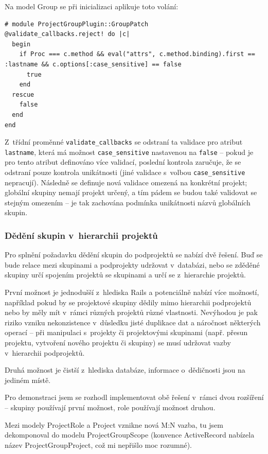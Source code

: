 \documentclass[thesis=B,czech]{FITthesis}[2012/05/02]
\begin{document}
Na model Group se při inicializaci aplikuje toto volání:

\begin{lstlisting}
# module ProjectGroupPlugin::GroupPatch
@validate_callbacks.reject! do |c|
  begin
    if Proc === c.method && eval("attrs", c.method.binding).first == :lastname && c.options[:case_sensitive] == false
      true
    end
  rescue
    false
  end
end
\end{lstlisting}
Z~třídní proměnné \lstinline!validate_callbacks! se odstraní ta validace
pro atribut \lstinline!lastname!, která má možnost
\lstinline!case_sensitive! nastavenou na \lstinline!false! -- pokud je pro
tento atribut definováno více validací, poslední kontrola zaručuje, že
se odstraní pouze kontrola unikátnosti (jiné validace s~volbou
\lstinline!case_sensitive! nepracují). Následně se definuje nová
validace omezená na konkrétní projekt; globální skupiny nemají projekt
určený, a tím pádem se budou také validovat se stejným omezením -- je tak
zachována podmínka unikátnosti názvů globálních skupin.

\subsubsection{Dědění skupin v~hierarchii projektů}
\label{sec:proj_group_inherit}

Pro splnění požadavku dědění skupin do podprojektů se nabízí dvě
řešení. Buď se bude relace mezi skupinami a podprojekty udržovat
v~databázi, nebo se zděděné skupiny určí spojením projektů se skupinami a
určí se z~hierarchie projektů.

První možnost je jednodušší z~hlediska Rails a potenciálně nabízí více
možností, například pokud by se projektové skupiny dědily mimo
hierarchii podprojektů nebo by měly mít v~rámci různých projektů různé
vlastnosti. Nevýhodou je pak riziko vzniku nekonzistence v~důsledku
jisté duplikace dat a náročnost některých operací -- při manipulaci
s~projekty či projektovými skupinami (např. přesun projektu, vytvoření
nového projektu či skupiny) se musí udržovat vazby v~hierarchii
podprojektů.

Druhá možnost je čistší z~hlediska databáze, informace o~dědičnosti jsou
na jediném místě.

Pro demonstraci jsem se rozhodl implementovat obě řešení v~rámci dvou
rozšíření -- skupiny používají první možnost, role používají možnost
druhou.

Mezi modely ProjectRole a Project vznikne nová M:N vazba, tu jsem
dekomponoval do modelu ProjectGroupScope (konvence ActiveRecord nabízela
název ProjectGroupProject, což mi nepřišlo moc rozumné).
\end{document}

